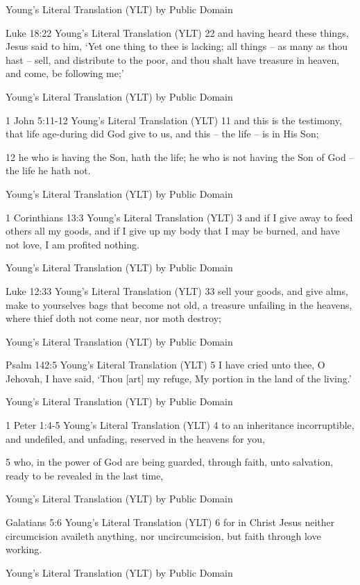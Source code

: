 \documentclass[11pt]{article}
\begin{document}
Young's Literal Translation (YLT)
by Public Domain

Luke 18:22 Young's Literal Translation (YLT)
22 and having heard these things, Jesus said to him, `Yet one thing to thee is lacking; all things -- as many as thou hast -- sell, and distribute to the poor, and thou shalt have treasure in heaven, and come, be following me;'

Young's Literal Translation (YLT)
by Public Domain

1 John 5:11-12 Young's Literal Translation (YLT)
11 and this is the testimony, that life age-during did God give to us, and this -- the life -- is in His Son;

12 he who is having the Son, hath the life; he who is not having the Son of God -- the life he hath not.

Young's Literal Translation (YLT)
by Public Domain

1 Corinthians 13:3 Young's Literal Translation (YLT)
3 and if I give away to feed others all my goods, and if I give up my body that I may be burned, and have not love, I am profited nothing.

Young's Literal Translation (YLT)
by Public Domain

Luke 12:33 Young's Literal Translation (YLT)
33 sell your goods, and give alms, make to yourselves bags that become not old, a treasure unfailing in the heavens, where thief doth not come near, nor moth destroy;

Young's Literal Translation (YLT)
by Public Domain

Psalm 142:5 Young's Literal Translation (YLT)
5 I have cried unto thee, O Jehovah, I have said, `Thou [art] my refuge, My portion in the land of the living.'

Young's Literal Translation (YLT)
by Public Domain

1 Peter 1:4-5 Young's Literal Translation (YLT)
4 to an inheritance incorruptible, and undefiled, and unfading, reserved in the heavens for you,

5 who, in the power of God are being guarded, through faith, unto salvation, ready to be revealed in the last time,

Young's Literal Translation (YLT)
by Public Domain

Galatians 5:6 Young's Literal Translation (YLT)
6 for in Christ Jesus neither circumcision availeth anything, nor uncircumcision, but faith through love working.

Young's Literal Translation (YLT)
by Public Domain
\end{document}
